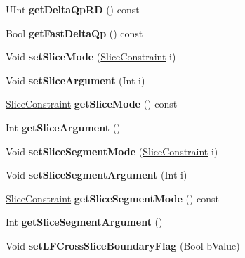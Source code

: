 \begin{DoxyCompactItemize}
U\+Int {\bfseries get\+Delta\+Qp\+RD} () const
\item 
\mbox{\label{class_t_enc_cfg_acf4dadca41cf1d250189abbca278603d}} 
Bool {\bfseries get\+Fast\+Delta\+Qp} () const
\item 
\mbox{\label{class_t_enc_cfg_a47d11297b39d3ebb5d5d632b0dbfe588}} 
Void {\bfseries set\+Slice\+Mode} (\hyperlink{_type_def_8h_add7235a66eb4e5f93c692468c39dde44}{Slice\+Constraint} i)
\item 
\mbox{\label{class_t_enc_cfg_a64c17e95f516d37c326cd04f52e82bf3}} 
Void {\bfseries set\+Slice\+Argument} (Int i)
\item 
\mbox{\label{class_t_enc_cfg_aecdb5961e7e87276dec5526cbccfdc1c}} 
\hyperlink{_type_def_8h_add7235a66eb4e5f93c692468c39dde44}{Slice\+Constraint} {\bfseries get\+Slice\+Mode} () const
\item 
\mbox{\label{class_t_enc_cfg_ac8fcec0b0ef652b9fe89591dc9f6472e}} 
Int {\bfseries get\+Slice\+Argument} ()
\item 
\mbox{\label{class_t_enc_cfg_a8de92eea9255410e9e0f84149b5af53b}} 
Void {\bfseries set\+Slice\+Segment\+Mode} (\hyperlink{_type_def_8h_add7235a66eb4e5f93c692468c39dde44}{Slice\+Constraint} i)
\item 
\mbox{\label{class_t_enc_cfg_ac46d00c14442c9dbcdf521936c564227}} 
Void {\bfseries set\+Slice\+Segment\+Argument} (Int i)
\item 
\mbox{\label{class_t_enc_cfg_ac14aa595989714cb3fc7d1899d749305}} 
\hyperlink{_type_def_8h_add7235a66eb4e5f93c692468c39dde44}{Slice\+Constraint} {\bfseries get\+Slice\+Segment\+Mode} () const
\item 
\mbox{\label{class_t_enc_cfg_acb60a4a96c5260befd576f840697567e}} 
Int {\bfseries get\+Slice\+Segment\+Argument} ()
\item 
\mbox{\label{class_t_enc_cfg_a336049dd50e30e132ee28fe8e69f873f}} 
Void {\bfseries set\+L\+F\+Cross\+Slice\+Boundary\+Flag} (Bool b\+Value)
\item 

\end{DoxyCompactItemize}
